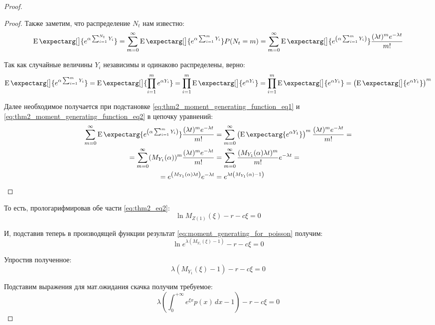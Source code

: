 \documentclass[a4paper,12pt]{article}
\theoremstyle{definition}
\newcommand{\expect}{\operatorname{E}\expectarg}
\begin{document}
\begin{proof}
\begin{proof}
Также заметим, что распределение $N_t$ нам известно:
\begin{equation}\label{eq:thm2_moment_generating_function_eq1}
     \expect[\big]{e^{\alpha \sum_{i=1}^{N_t} Y_i}} = \sum_{m=0}^{\infty} \expect[\big]{e^{\alpha \sum_{i=1}^{m} Y_i}} P(N_t = m) = \sum_{m=0}^{\infty} \expect[\big]{e^{\left(\alpha \sum_{i=1}^{m} Y_i\right)}} \frac{(\lambda t)^{m} e^{-\lambda t}}{m!}
\end{equation}

Так как случайные величины $Y_i$ независимы и одинаково распределены, верно:
\begin{equation}\label{eq:thm2_moment_generating_function_eq2}
     \expect[\big]{e^{\alpha \sum_{i=1}^{m} Y_i}} = \expect[\big]{\prod_{i=1}^{m} e^{\alpha Y_i}} = \prod_{i=1}^{m}  \expect[\big]{e^{\alpha Y_i}} = \prod_{i=1}^{m}  \expect[\big]{e^{\alpha Y_1}} = \left( \expect[\big]{e^{\alpha Y_1}} \right)^{m}
\end{equation}

Далее необходимое получается при подстановке \eqref{eq:thm2_moment_generating_function_eq1} и \eqref{eq:thm2_moment_generating_function_eq2} в цепочку уравнений:
\begin{equation*}
\begin{split}
    \sum_{m=0}^{\infty} \expect{e^{\left(\alpha \sum_{i=1}^{m} Y_i\right)}} \frac{(\lambda t)^{m} e^{-\lambda t}}{m!} &= \sum_{m=0}^{\infty} \left(\expect{e^{\alpha Y_1}}\right)^{m} \frac{(\lambda t)^{m} e^{-\lambda t}}{m!} =\\
    = \sum_{m=0}^{\infty} (M_{Y_1} (\alpha))^{m} \frac{(\lambda t)^{m} e^{-\lambda t}}{m!} &= \sum_{m=0}^{\infty} \frac{(M_{Y_1} (\alpha) \lambda t)^{m}}{m!} e^{-\lambda t} =\\
    = e^{\left(M_{Y_1} (\alpha) \lambda t\right)} e^{-\lambda t} &= e^{\lambda t \left(M_{Y_1}(\alpha) - 1\right)}
\end{split}
\end{equation*}
\end{proof}

То есть, прологарифмировав обе части \eqref{eq:thm2_eq2}:
\begin{equation*}
\ln{M_{Z(1)}(\xi)} - r - c\xi = 0
\end{equation*}

И, подставив теперь в производящей функции результат \eqref{eq:moment_generating_for_poisson} получим:
\begin{equation*}
\ln{e^{\lambda (M_{Y_1}(\xi) - 1)}} - r - c\xi = 0
\end{equation*}

Упростив полученное:
\begin{equation*}
\lambda \left(M_{Y_1}(\xi) - 1\right) - r - c\xi = 0
\end{equation*}

Подставим выражения для мат.ожидания скачка получим требуемое:
\begin{equation*}
\lambda \left(\int_{0}^{+\infty} e^{\xi x} p(x) \,dx - 1\right) - r - c\xi = 0
\end{equation*}
\end{proof}
\end{document}
